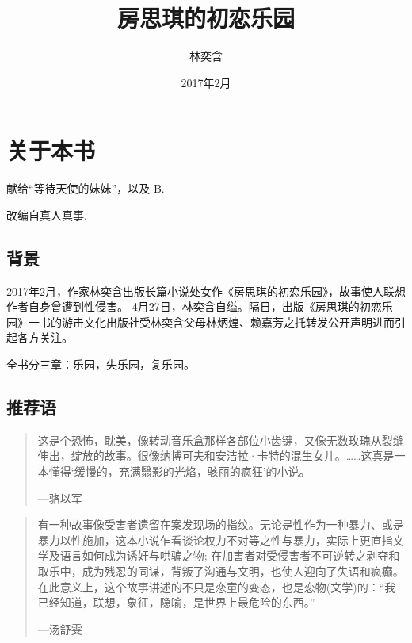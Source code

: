 \documentclass[12pt,UTF8]{ctexbook}
\title{房思琪的初恋乐园}
\author{林奕含}
\date{2017年2月}
\begin{document}
\maketitle

{
\setcounter{tocdepth}{0}
\tableofcontents
}
\hypertarget{aboutbook}{%
\chapter*{关于本书}\label{aboutbook}}

献给\enquote{等待天使的妹妹}，以及 B.

改编自真人真事.

\hypertarget{ux80ccux666f}{%
\section*{背景}\label{ux80ccux666f}}

2017年2月，作家林奕含出版长篇小说处女作《房思琪的初恋乐园》，故事使人联想作者自身曾遭到性侵害。 4月27日，林奕含自缢。隔日，出版《房思琪的初恋乐园》一书的游击文化出版社受林奕含父母林炳煌、赖嘉芳之托转发公开声明进而引起各方关注。

全书分三章：乐园，失乐园，复乐园。

\hypertarget{ux63a8ux8350ux8bed}{%
\section*{推荐语}\label{ux63a8ux8350ux8bed}}

\begin{quote}
这是个恐怖，耽美，像转动音乐盒那样各部位小齿键，又像无数玫瑰从裂缝伸出，绽放的故事。很像纳博可夫和安洁拉·卡特的混生女儿。\ldots{}\ldots{}这真是一本懂得`缓慢的，充满翳影的光焰，骇丽的疯狂'的小说。

---骆以军
\end{quote}

\begin{quote}
有一种故事像受害者遗留在案发现场的指纹。无论是性作为一种暴力、或是暴力以性施加，这本小说乍看谈论权力不对等之性与暴力，实际上更直指文学及语言如何成为诱奸与哄骗之物; 在加害者对受侵害者不可逆转之剥夺和取乐中，成为残忍的同谋，背叛了沟通与文明，也使人迎向了失语和疯癫。在此意义上，这个故事讲述的不只是恋童的变态，也是恋物(文学)的：\enquote{我已经知道，联想，象征，隐喻，是世界上最危险的东西。}

---汤舒雯
\end{quote}
\end{document}

